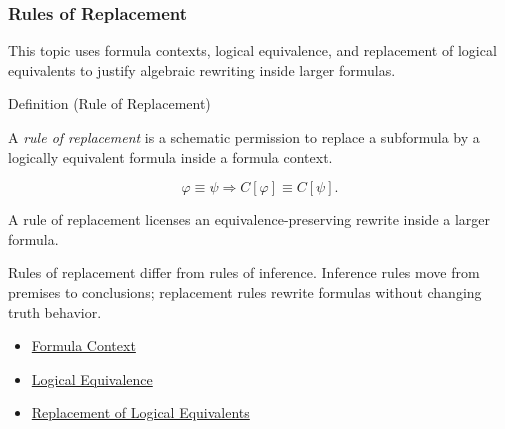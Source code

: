 \subsubsection*{Rules of Replacement}

\begin{remark*}
This topic uses formula contexts, logical equivalence, and replacement of
logical equivalents to justify algebraic rewriting inside larger formulas.
\end{remark*}

\begin{definitionbox}{Definition (Rule of Replacement)}
\begin{definition}
\label{def:rule-of-replacement-propositional-logic}
A \emph{rule of replacement} is a schematic permission to replace a subformula
by a logically equivalent formula inside a formula context.
\end{definition}
\end{definitionbox}

\begin{remark*}
\[
\varphi\equiv\psi
\Longrightarrow
C[\varphi]\equiv C[\psi].
\]
\end{remark*}

\begin{remark*}
A rule of replacement licenses an equivalence-preserving rewrite inside a larger
formula.
\end{remark*}

\begin{remark*}[Interpretation]
Rules of replacement differ from rules of inference. Inference rules move from
premises to conclusions; replacement rules rewrite formulas without changing
truth behavior.
\end{remark*}

\begin{dependencies}
\begin{itemize}
  \item \hyperref[def:formula-context-propositional-logic]{Formula Context}
  \item \hyperref[def:logical-equivalence-propositional-logic]{Logical Equivalence}
  \item \hyperref[thm:replacement-of-logical-equivalents-propositional-logic]{Replacement of Logical Equivalents}
\end{itemize}
\end{dependencies}

